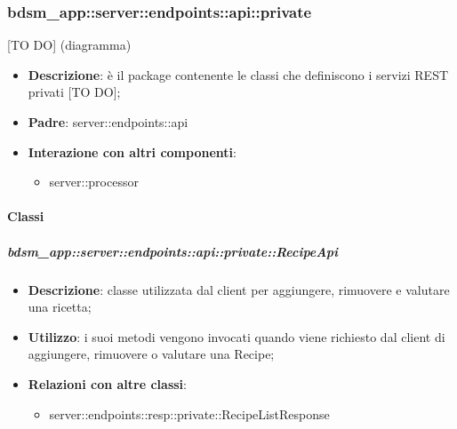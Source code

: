\subsubsection{bdsm\_app::server::endpoints::api::private} %
\label{ssub:bdsm_app_server_endpoints_api_private}
[TO DO] (diagramma) \newline \newline

\begin{itemize}
  \item \textbf{Descrizione}: è il package contenente le classi che definiscono i servizi REST privati [TO DO];
  \item \textbf{Padre}: server::endpoints::api
  \item \textbf{Interazione con altri componenti}:
  	\begin{itemize}
        \item server::processor
    \end{itemize}
\end{itemize}

	\paragraph{Classi} %

    \subparagraph{bdsm\_app::server::endpoints::api::private::RecipeApi} %
    \label{subp:bdsm_app_server_endpoints_api_private_recipeapi}
    \begin{itemize}
      \item \textbf{Descrizione}: classe utilizzata dal client per aggiungere, rimuovere e valutare una ricetta;
      \item \textbf{Utilizzo}: i suoi metodi vengono invocati quando viene richiesto dal client di aggiungere, rimuovere o valutare una Recipe;
      \item \textbf{Relazioni con altre classi}:
        \begin{itemize}
          \item server::endpoints::resp::private::RecipeListResponse
        \end{itemize}
      \end{itemize}
    
